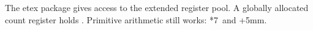 \documentclass{article}
\begin{document}
The etex package gives access to the extended register pool.
A globally allocated count register holds \the\democount.
Primitive arithmetic still works: \the{}*7\relax\ and \the\dimexpr 1cm+5mm\relax.
\end{document}
